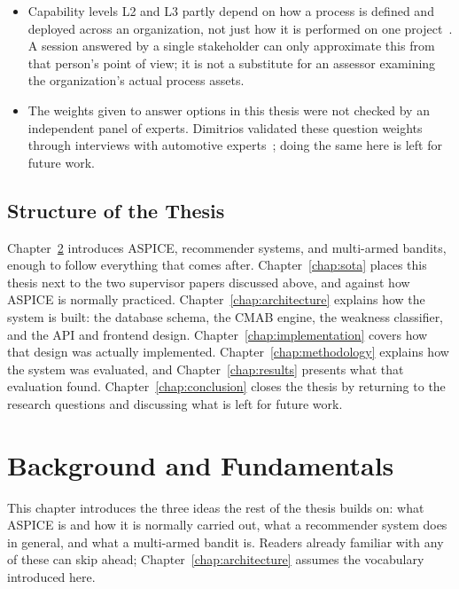 \documentclass[a4paper, 12pt, oneside, openany, BCOR1cm,toc=chapterentrywithdots]{scrbook}
\begin{document}
\begin{itemize}
  \item Capability levels L2 and L3 partly depend on how a process is defined and deployed
  across an organization, not just how it is performed on one project~\cite{vdaqmc2023pam}. A
  session answered by a single stakeholder can only approximate this from that person's point of
  view; it is not a substitute for an assessor examining the organization's actual process
  assets.
  \item The weights given to answer options in this thesis were not checked by an independent
  panel of experts. Dimitrios validated these question weights through interviews with
  automotive experts~\cite{datsogiannis2024early}; doing the same here is left for future work.
\end{itemize}

\section{Structure of the Thesis}

Chapter~\ref{chap:background} introduces ASPICE, recommender systems, and multi-armed bandits,
enough to follow everything that comes after. Chapter~\ref{chap:sota} places this thesis next to
the two supervisor papers discussed above, and against how ASPICE is normally practiced.
Chapter~\ref{chap:architecture} explains how the system is built: the database schema, the CMAB
engine, the weakness classifier, and the API and frontend design. Chapter~\ref{chap:implementation}
covers how that design was actually implemented. Chapter~\ref{chap:methodology} explains how the
system was evaluated, and Chapter~\ref{chap:results} presents what that evaluation found.
Chapter~\ref{chap:conclusion} closes the thesis by returning to the research questions and
discussing what is left for future work.

\chapter{Background and Fundamentals}
\label{chap:background}
% 

This chapter introduces the three ideas the rest of the thesis builds on: what ASPICE is and how
it is normally carried out, what a recommender system does in general, and what a multi-armed
bandit is. Readers already familiar with any of these can skip ahead; Chapter~\ref{chap:architecture}
assumes the vocabulary introduced here.
\end{document}
